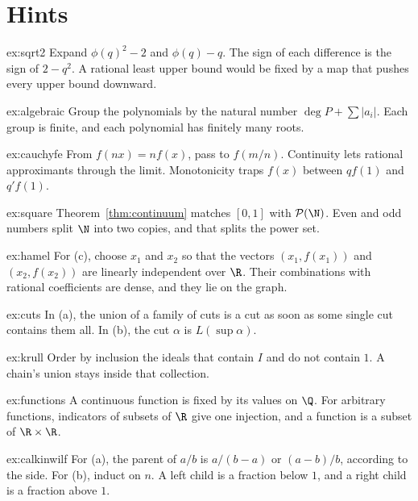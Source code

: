 \section{Hints}

\begin{hint}{ex:sqrt2}
Expand $\phi(q)^2-2$ and $\phi(q)-q$. The sign of each difference is the sign of $2-q^2$. A rational least upper bound would be fixed by a map that pushes every upper bound downward.
\end{hint}
\begin{hint}{ex:algebraic}
Group the polynomials by the natural number $\deg P+\sum|a_i|$. Each group is finite, and each polynomial has finitely many roots.
\end{hint}
\begin{hint}{ex:cauchyfe}
From $f(nx)=nf(x)$, pass to $f(m/n)$. Continuity lets rational approximants through the limit. Monotonicity traps $f(x)$ between $qf(1)$ and $q'f(1)$.
\end{hint}
\begin{hint}{ex:square}
Theorem~\ref{thm:continuum} matches $[0,1]$ with $\mathcal P(\N)$. Even and odd numbers split $\N$ into two copies, and that splits the power set.
\end{hint}
\begin{hint}{ex:hamel}
For (c), choose $x_1$ and $x_2$ so that the vectors $(x_1,f(x_1))$ and $(x_2,f(x_2))$ are linearly independent over $\R$. Their combinations with rational coefficients are dense, and they lie on the graph.
\end{hint}
\begin{hint}{ex:cuts}
In (a), the union of a family of cuts is a cut as soon as some single cut contains them all. In (b), the cut $\alpha$ is $L(\sup\alpha)$.
\end{hint}
\begin{hint}{ex:krull}
Order by inclusion the ideals that contain $I$ and do not contain $1$. A chain's union stays inside that collection.
\end{hint}
\begin{hint}{ex:functions}
A continuous function is fixed by its values on $\Q$. For arbitrary functions, indicators of subsets of $\R$ give one injection, and a function is a subset of $\R\times\R$.
\end{hint}
\begin{hint}{ex:calkinwilf}
For (a), the parent of $a/b$ is $a/(b-a)$ or $(a-b)/b$, according to the side. For (b), induct on $n$. A left child is a fraction below $1$, and a right child is a fraction above $1$.
\end{hint}

